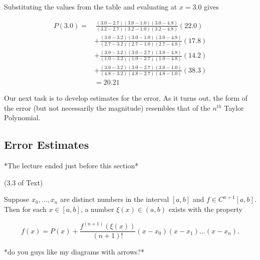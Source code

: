 Substituting the values from the table and evaluating at $x=3.0$ gives 

\begin{align*}
    P(3.0) = &\ \frac{(3.0 - 2.7)(3.0 - 1.0)(3.0 - 4.8)}{(3.2 - 2.7)(3.2 - 1.0)(3.2 - 4.8)} (22.0) \\
    &+ \frac{(3.0 - 3.2)(3.0 - 1.0)(3.0 - 4.8)}{(2.7 - 3.2)(2.7 - 1.0)(2.7 - 4.8)} (17.8) \\
    &+ \frac{(3.0 - 3.2)(3.0 - 2.7)(3.0 - 4.8)}{(1.0 - 3.2)(1.0 - 2.7)(1.0 - 4.8)} (14.2) \\
    &+ \frac{(3.0 - 3.2)(3.0 - 2.7)(3.0 - 1.0)}{(4.8 - 3.2)(4.8 - 2.7)(4.8 - 1.0)} (38.3) \\
    &= 20.21
\end{align*}

Our next task is to develop estimates for the error. As it turns out, the form
of the error (but not necessarily the magnitude) resembles that of the $n^{th}$
Taylor Polynomial.

\subsection{Error Estimates}

*The lecture ended just before this section*

\thm (3.3 of Text)

Suppose $x_0, \dots, x_n$ are distinct numbers in the interval $[a,b]$ and
$f\in C^{n+1}[a,b]$. Then for each $x\in [a,b]$, a number $\xi(x)\in(a,b)$
exists with the property

\[
  f(x) = P(x) + \frac{f^{(n+1)}(\xi(x))}{(n+1)!} (x-x_0) (x-x_1) \dots (x-x_n)
.\]

\begin{center}
\end{center}

*do you guys like my diagrams with arrows?*

